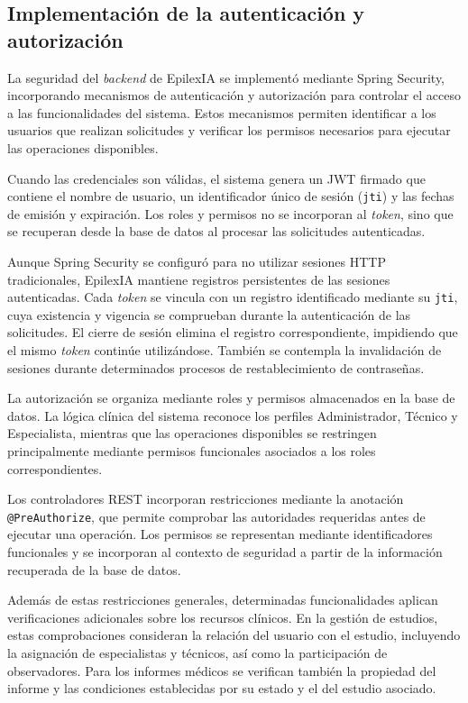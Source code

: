 \subsection{Implementación de la autenticación y autorización}

La seguridad del \textit{backend} de EpilexIA se implementó mediante
Spring Security, incorporando mecanismos de autenticación
y autorización para controlar el acceso a las funcionalidades
del sistema. Estos mecanismos permiten identificar a los
usuarios que realizan solicitudes y verificar los permisos
necesarios para ejecutar las operaciones disponibles.

Cuando las credenciales son válidas, el sistema genera un
JWT firmado que contiene el nombre de usuario, un
identificador único de sesión (\texttt{jti}) y las fechas
de emisión y expiración. Los roles y permisos no se
incorporan al \textit{token}, sino que se recuperan desde la base
de datos al procesar las solicitudes autenticadas.

Aunque Spring Security se configuró para no utilizar
sesiones HTTP tradicionales, EpilexIA mantiene registros
persistentes de las sesiones autenticadas. Cada \textit{token}
se vincula con un registro identificado mediante su
\texttt{jti}, cuya existencia y vigencia se comprueban
durante la autenticación de las solicitudes. El cierre
de sesión elimina el registro correspondiente, impidiendo
que el mismo \textit{token} continúe utilizándose. También se
contempla la invalidación de sesiones durante determinados
procesos de restablecimiento de contraseñas.

La autorización se organiza mediante roles y permisos
almacenados en la base de datos. La lógica clínica del
sistema reconoce los perfiles Administrador, Técnico
y Especialista, mientras que las operaciones disponibles
se restringen principalmente mediante permisos
funcionales asociados a los roles correspondientes.

Los controladores REST incorporan restricciones mediante
la anotación \texttt{@PreAuthorize}, que permite comprobar
las autoridades requeridas antes de ejecutar una operación.
Los permisos se representan mediante identificadores
funcionales y se incorporan al contexto de seguridad
a partir de la información recuperada de la base de datos.

Además de estas restricciones generales, determinadas
funcionalidades aplican verificaciones adicionales sobre
los recursos clínicos. En la gestión de estudios, estas
comprobaciones consideran la relación del usuario con
el estudio, incluyendo la asignación de especialistas
y técnicos, así como la participación de observadores.
Para los informes médicos se verifican también la
propiedad del informe y las condiciones establecidas
por su estado y el del estudio asociado.

